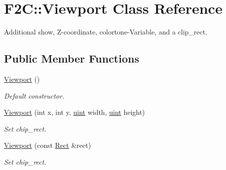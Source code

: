\hypertarget{class_f2_c_1_1_viewport}{
\section{F2C::Viewport Class Reference}
\label{class_f2_c_1_1_viewport}
}


Additional show, Z-\/coordinate, colortone-\/Variable, and a clip\_\-rect.  
\subsection*{Public Member Functions}
\begin{DoxyCompactItemize}
\item 
\hypertarget{class_f2_c_1_1_viewport_a389ea1f7672c28a4d54f9877287ea5bd}{
\hyperlink{class_f2_c_1_1_viewport_a389ea1f7672c28a4d54f9877287ea5bd}{Viewport} ()}
\label{class_f2_c_1_1_viewport_a389ea1f7672c28a4d54f9877287ea5bd}

\begin{DoxyCompactList}\small\item\em Default constructor. \item\end{DoxyCompactList}\item 
\hyperlink{class_f2_c_1_1_viewport_a95b9c60d6537d37caf560a93c509735b}{Viewport} (int x, int y, \hyperlink{namespace_f2_c_a58be2bac9eb3e3c99cb41b6008bf4fae}{uint} width, \hyperlink{namespace_f2_c_a58be2bac9eb3e3c99cb41b6008bf4fae}{uint} height)
\begin{DoxyCompactList}\small\item\em Set chip\_\-rect. \item\end{DoxyCompactList}\item 
\hyperlink{class_f2_c_1_1_viewport_a8d66a03451361d3bc5e783242e6a5dfe}{Viewport} (const \hyperlink{class_f2_c_1_1_rect}{Rect} \&rect)
\begin{DoxyCompactList}\small\item\em Set chip\_\-rect. \item\end{DoxyCompactList}\end{DoxyCompactItemize}
